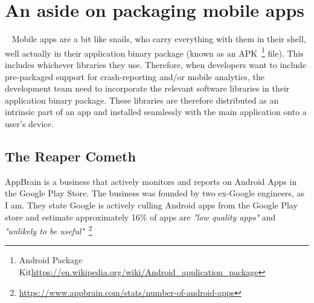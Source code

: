 \section{An aside on packaging mobile apps}~\label{section-packaging-mobile-apps}
Mobile apps are a bit like snails, who carry everything with them in their shell, well actually in their application binary package (known as an APK~\footnote{Android Package Kit\url{https://en.wikipedia.org/wiki/Android_application_package}} file). This includes whichever libraries they use. Therefore, when developers want to include pre-packaged support for crash-reporting and/or mobile analytics, the development team need to incorporate the relevant software libraries in their application binary package. These libraries are therefore distributed as an intrinsic part of an app and installed seamlessly with the main application onto a user's device.


\subsection{The Reaper Cometh}
AppBrain is a business that actively monitors and reports on Android Apps in the Google Play Store. The business was founded by two ex-Google engineers, as I am. They state Google is actively culling Android apps from the Google Play store and estimate approximately 16\% of apps are \emph{"low quality apps"} and \emph{"unlikely to be useful"}~\footnote{\url{https://www.appbrain.com/stats/number-of-android-apps}} %

